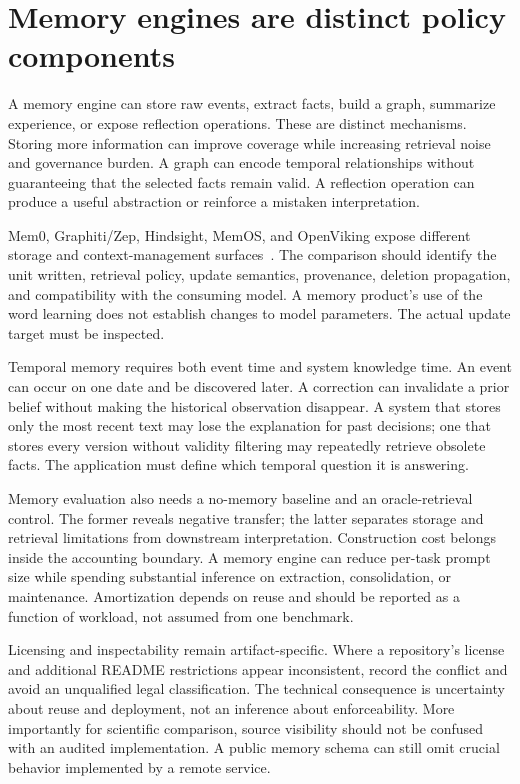 \section{Memory engines are distinct policy components}\label{sec:C24:memoryproducts}
A memory engine can store raw events, extract facts, build a graph, summarize experience, or expose reflection operations. These are distinct mechanisms. Storing more information can improve coverage while increasing retrieval noise and governance burden. A graph can encode temporal relationships without guaranteeing that the selected facts remain valid. A reflection operation can produce a useful abstraction or reinforce a mistaken interpretation.

Mem0, Graphiti/Zep, Hindsight, MemOS, and OpenViking expose different storage and context-management surfaces~\cite{executionproduct024,executionproduct033,executionproduct040,executionproduct083,executionproduct084}. The comparison should identify the unit written, retrieval policy, update semantics, provenance, deletion propagation, and compatibility with the consuming model. A memory product's use of the word learning does not establish changes to model parameters. The actual update target must be inspected.

Temporal memory requires both event time and system knowledge time. An event can occur on one date and be discovered later. A correction can invalidate a prior belief without making the historical observation disappear. A system that stores only the most recent text may lose the explanation for past decisions; one that stores every version without validity filtering may repeatedly retrieve obsolete facts. The application must define which temporal question it is answering.

Memory evaluation also needs a no-memory baseline and an oracle-retrieval control. The former reveals negative transfer; the latter separates storage and retrieval limitations from downstream interpretation. Construction cost belongs inside the accounting boundary. A memory engine can reduce per-task prompt size while spending substantial inference on extraction, consolidation, or maintenance. Amortization depends on reuse and should be reported as a function of workload, not assumed from one benchmark.

Licensing and inspectability remain artifact-specific. Where a repository's license and additional README restrictions appear inconsistent, record the conflict and avoid an unqualified legal classification. The technical consequence is uncertainty about reuse and deployment, not an inference about enforceability. More importantly for scientific comparison, source visibility should not be confused with an audited implementation. A public memory schema can still omit crucial behavior implemented by a remote service.

